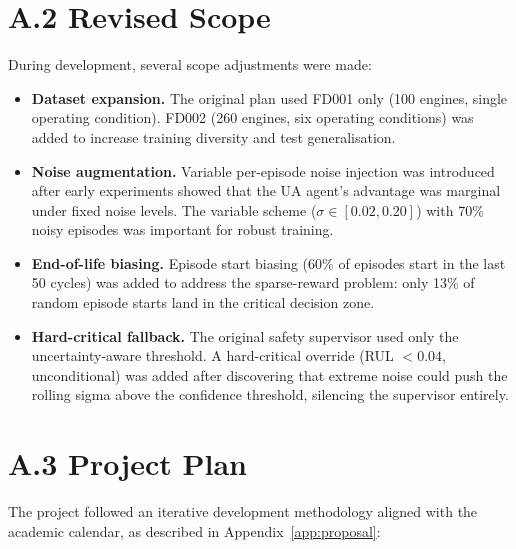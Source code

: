 \documentclass[12pt,a4paper]{report}
\begin{document}
\section*{A.2 Revised Scope}

During development, several scope adjustments were made:

\begin{itemize}
    \item \textbf{Dataset expansion.} The original plan used FD001 only (100 engines, single operating condition). FD002 (260 engines, six operating conditions) was added to increase training diversity and test generalisation.
    \item \textbf{Noise augmentation.} Variable per-episode noise injection was introduced after early experiments showed that the UA agent's advantage was marginal under fixed noise levels. The variable scheme ($\sigma \in [0.02, 0.20]$) with 70\% noisy episodes was important for robust training.
    \item \textbf{End-of-life biasing.} Episode start biasing (60\% of episodes start in the last 50 cycles) was added to address the sparse-reward problem: only 13\% of random episode starts land in the critical decision zone.
    \item \textbf{Hard-critical fallback.} The original safety supervisor used only the uncertainty-aware threshold. A hard-critical override (RUL $< 0.04$, unconditional) was added after discovering that extreme noise could push the rolling sigma above the confidence threshold, silencing the supervisor entirely.
\end{itemize}

\section*{A.3 Project Plan}

The project followed an iterative development methodology aligned with the academic calendar, as described in Appendix~\ref{app:proposal}:
\end{document}
